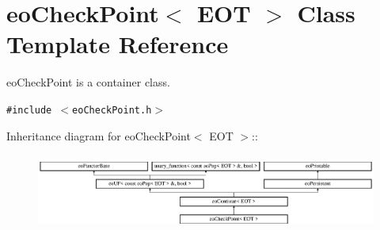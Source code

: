 \section{eo\-Check\-Point$<$ EOT $>$ Class Template Reference}
\label{classeo_check_point}
eo\-Check\-Point is a container class.  


{\tt \#include $<$eo\-Check\-Point.h$>$}

Inheritance diagram for eo\-Check\-Point$<$ EOT $>$::\begin{figure}[H]
\begin{center}
\leavevmode
\includegraphics[height=2.52252cm]{classeo_check_point}
\end{center}
\end{figure}
